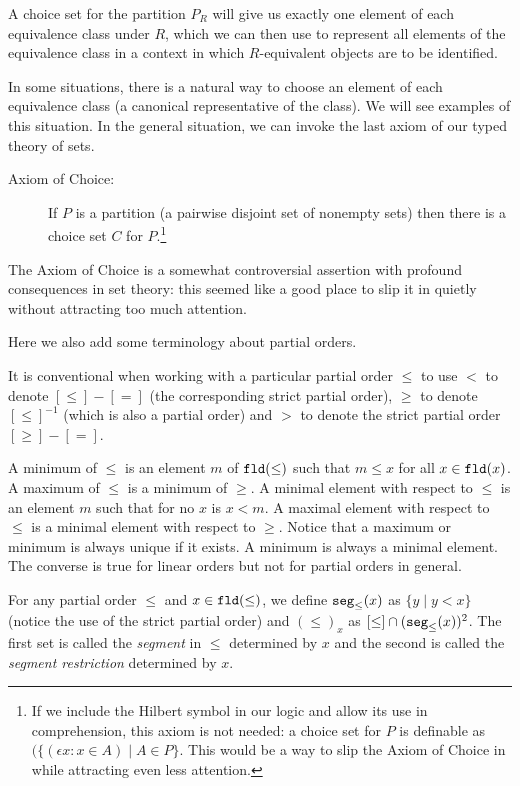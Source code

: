 \documentclass[12pt]{book}
\begin{document}
A choice set for the partition $P_R$ will give us exactly one element
of each equivalence class under $R$, which we can then use to
represent all elements of the equivalence class in a context in which
$R$-equivalent objects are to be identified.

In some situations, there is a natural way to choose an element of
each equivalence class (a canonical representative of the class).  We
will see examples of this situation.  In the general situation, we can
invoke the last axiom of our typed theory of sets.

\begin{description}

\item[Axiom of Choice:] If $P$ is a partition (a pairwise disjoint set
of nonempty sets) then there is a choice set $C$ for $P$.\footnote{If we include the Hilbert symbol in our logic and allow its use in comprehension, this axiom is not needed:  a choice set for $P$ is definable as $(\{(\epsilon x:x \in A)\mid A \in P\}$.  This would be a way to slip the Axiom of Choice in while attracting even less attention.}

\end{description}

The Axiom of Choice is a somewhat controversial assertion with
profound consequences in set theory: this seemed like a good place to
slip it in quietly without attracting too much attention.

Here we also add some terminology about partial orders.

It is conventional when working with a particular partial order $\leq$
to use $<$ to denote $[\leq]-[=]$ (the corresponding strict partial
order), $\geq$ to denote $[\leq]^{-1}$ (which is also a partial order)
and $>$ to denote the strict partial order $[\geq]-[=]$.

A minimum of $\leq$ is an element $m$ of ${\tt fld}(\leq)$ such that
$m \leq x$ for all $x \in {\tt fld}(x)$.  A maximum of $\leq$ is a
minimum of $\geq$.  A minimal element with respect to $\leq$ is an
element $m$ such that for no $x$ is $x < m$.  A maximal element with
respect to $\leq$ is a minimal element with respect to $\geq$.  Notice
that a maximum or minimum is always unique if it exists.  A minimum is
always a minimal element.  The converse is true for linear orders but
not for partial orders in general.

For any partial order $\leq$ and $x \in {\tt fld}(\leq)$, we define
${\tt seg}_{\leq}(x)$ as $\{y \mid y < x\}$ (notice the use of the
strict partial order) and $(\leq)_x$ as $[\leq] \cap ({\tt
seg}_{\leq}(x))^2$.  The first set is called the {\em segment\/} in $\leq$
determined by $x$ and the second is called the {\em segment restriction\/}
determined by $x$.
\end{document}
